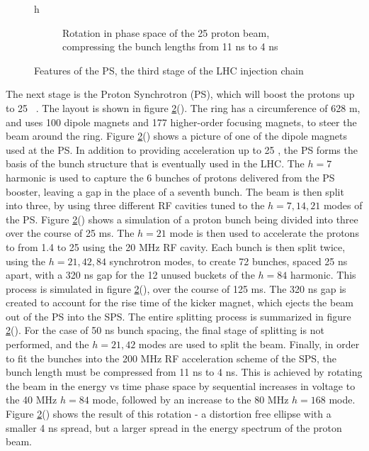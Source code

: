 \begin{figure}{h}
\begin{subfigure}[h]{0.45\textwidth}
        \caption{Rotation in phase space of the 25 \GeV proton beam,
          compressing the bunch lengths from 11 ns to 4 ns \cite{LHC:TDR_Vol3_InjectionChain_Benedikt}}\label{fig:ps_bunch_compression}
      \end{subfigure}
      \caption{Features of the PS, the third stage of
        the LHC injection chain}\label{fig:ps}
\end{figure}


\par The next stage is the Proton Synchrotron (PS), which will boost the
protons up to 25 \GeV~\cite{LHC:TDR_Vol3_InjectionChain_Benedikt}.
The layout is shown in figure \ref{fig:ps}().  
The ring has a circumference of 628 m, and uses 100 dipole magnets and
177 higher-order focusing magnets, to steer the beam around the ring.
Figure \ref{fig:ps}() shows a picture of one of
the dipole magnets used at the PS.  In addition to providing
acceleration up to 25 \GeV, the PS forms the basis of the bunch
structure that is eventually used in the LHC.  The $h=7$ harmonic is
used to capture the 6 bunches of protons delivered from the PS
booster, leaving a gap in the place of a seventh bunch.  The beam is
then split into three, by using three different RF cavities tuned to
the $h=7,14,21$ modes of the PS.  Figure
\ref{fig:ps}() shows a simulation of a proton
bunch being divided  into three over the course of 25 ms.  The $h=21$
mode is then used to accelerate the protons to from 1.4 to 25 \GeV
using the 20 MHz RF cavity.  Each bunch is then split twice,
using the $h=21,42,84$ synchrotron modes, to create 72 bunches, spaced
25 ns apart, with a 320 ns gap for the 12 unused buckets of the $h=84$
harmonic. This process is simulated in figure
\ref{fig:ps}(), over the course of 125 ms. The
320 ns gap is created to account for the rise time of the  kicker
magnet, which ejects the beam out of the PS into the SPS.  The entire
splitting process is summarized in figure
\ref{fig:ps}().  For the case of 50 ns bunch
spacing, the final stage of splitting is not performed, and the
$h=21,42$ modes are used to split the beam.  Finally, in order to fit
the bunches into the 200 MHz RF acceleration scheme of the SPS, the 
bunch length must be compressed from 11 ns to 4 ns.  This is achieved
by rotating the beam in the energy vs time phase space by sequential
increases in voltage to the 40 MHz $h=84$ mode, followed by an
increase to the 80 MHz $h=168$ mode.  Figure
\ref{fig:ps}() shows the result of
this rotation - a distortion free ellipse with a smaller 4 ns spread,
but a larger spread in the energy spectrum of the proton beam.   

